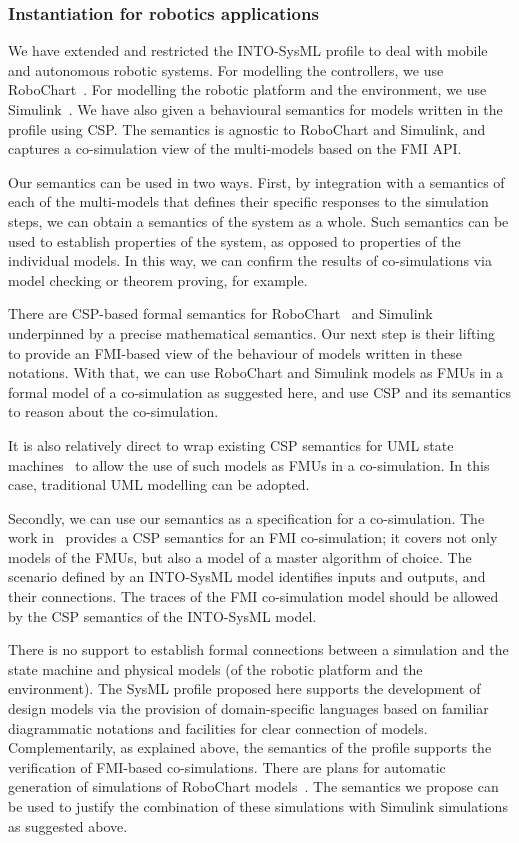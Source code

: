 \subsubsection{Instantiation for robotics applications}

We have extended and restricted the INTO-SysML profile to deal with mobile and autonomous robotic systems. For modelling the controllers, we use RoboChart~\cite{LiMRCWT2017}. For modelling the robotic platform and the environment, we use Simulink~\cite{MathworksURL}. We have also given a behavioural semantics for models written in the profile using CSP. The semantics is agnostic to RoboChart and Simulink, and captures a co-simulation view of the multi-models based on the FMI API.

Our semantics can be used in two ways. First, by integration with a semantics of each of the multi-models that defines their specific responses to the simulation steps, we can obtain a semantics of the system as a whole. Such semantics can be used to establish properties of the system, as opposed to properties of the individual models. In this way, we can confirm the results of co-simulations via model checking or theorem proving, for example.

There are CSP-based formal semantics for RoboChart~\cite{MiyazawaCRLWT2016} and Simu\-link~\cite{MarriottZC2012,CavalcantiMW2013} underpinned by a precise mathematical semantics. Our next step is their lifting to provide an FMI-based view of the behaviour of models written in these notations. With that, we can use RoboChart and Simulink models as FMUs in a formal model of a co-simulation as suggested here, and use CSP and its semantics to reason about the co-simulation.

It is also relatively direct to wrap existing CSP semantics for UML state machines~\cite{DaviesC2003,RaschW2005} to allow the use of such models as FMUs in a co-simulation. In this case, traditional UML modelling can be adopted.

Secondly, we can use our semantics as a specification for a co-simulation. The work in~\cite{CavalcantiWA16} provides a CSP semantics for an FMI co-simulation; it covers not only models of the FMUs, but also a model of a master algorithm of choice. The scenario defined by an INTO-SysML model identifies inputs and outputs, and their connections. The traces of the FMI co-simulation model should be allowed by the CSP semantics of the INTO-SysML model.

There is no support to establish formal connections between a simulation and the state machine and physical models (of the robotic platform and the environment). The SysML profile proposed here supports the development of design models via the provision of domain-specific languages based on familiar diagrammatic notations and facilities for clear connection of models. Complementarily, as explained above, the semantics of the profile supports the verification of FMI-based co-simulations.  There are plans for automatic generation of simulations of RoboChart models~\cite{CavalcantiWA16}. The semantics we propose can be used to justify the combination of these simulations with Simulink simulations as suggested above.

